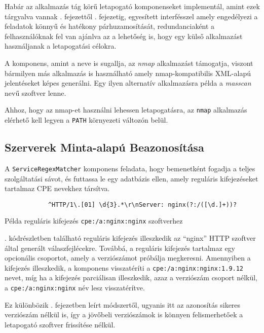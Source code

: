 	Habár az alkalmazás tág körű letapogató komponenseket implementál, amint ezek tárgyalva vannak \az{\ref{icmpping}}. fejezettől \az{\ref{udpscan}}. fejezetig, egyesített interfésszel amely engedélyezi a feladatok könnyű és hatékony párhuzamosítását, redundanciaként a felhasználóknak fel van ajánlva az a lehetőség is, hogy egy külső alkalmazást használjanak a letapogatási célokra.
	
	A komponens, amint a neve is sugallja, az \textit{nmap} alkalmazást támogatja, viszont bármilyen más alkalmazás is használható amely nmap-kompatibilis XML-alapú jelentéseket képes generálni. Egy ilyen alternatív alkalmazásra példa a \textit{masscan} nevű szoftver lenne.
	
	Ahhoz, hogy az nmap-et használni lehessen letapogatásra, az \texttt{nmap} alkalmazás elérhető kell legyen a \texttt{PATH} környezeti változón belül.

\subsection*{Szerverek Minta-alapú Beazonosítása}

	A \texttt{ServiceRegexMatcher} komponens feladata, hogy bemenetként fogadja a teljes szolgáltatási sávot, és futtassa le egy adatbázis ellen, amely reguláris kifejezéseket tartalmaz CPE nevekhez társítva.

	\begin{listing}[H]
		\begin{verbatim}
			^HTTP/1\.[01] \d{3}.*\r\nServer: nginx(?:/([\d.]+))?
		\end{verbatim}
		\caption{Példa reguláris kifejezés \texttt{cpe:/a:nginx:nginx} szoftverhez}
		\label{nginxregex_hu}
	\end{listing}
	
	\Az{\ref{nginxregex_hu}}. kódrészletben található reguláris kifejezés illeszkedik az ``nginx'' HTTP szoftver által generált válaszfejlécekre. Továbbá, a reguláris kifejezés tartalmaz egy opcionális csoportot, amely a verziószámot próbálja megkeresni. Amennyiben a kifejezés illeszkedik, a komponens visszatéríti a \texttt{cpe:/a:nginx:nginx:1.9.12} nevet, míg ha a kifejezés parciálisan illeszkedik, azaz a verziószám csoport nélkül, a \texttt{cpe:/a:nginx:nginx} név lesz visszatérítve.
	
	Ez különbözik \az{\ref{matchcpe}}. fejezetben leírt módszertől, ugyanis itt az azonosítás sikeres verziószám nélkül is, így a jövőbeli verziószámok is könnyen felismerhetőek a letapogató szoftver frissítése nélkül.
	
